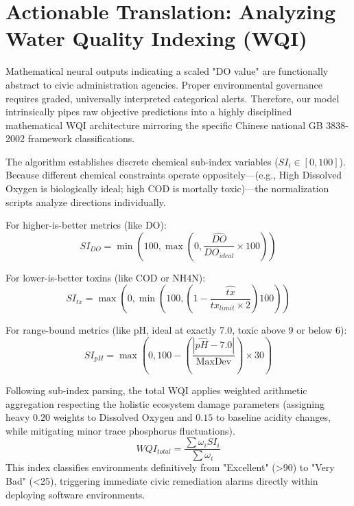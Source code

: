 \documentclass[journal,10pt,twocolumn]{IEEEtran}
\begin{document}
\section{Actionable Translation: Analyzing Water Quality Indexing (WQI)}
Mathematical neural outputs indicating a scaled "DO value" are functionally abstract to civic administration agencies. Proper environmental governance requires graded, universally interpreted categorical alerts. Therefore, our model intrinsically pipes raw objective predictions into a highly disciplined mathematical WQI architecture mirroring the specific Chinese national GB 3838-2002 framework classifications.

The algorithm establishes discrete chemical sub-index variables ($SI_i \in [0, 100]$). Because different chemical constraints operate oppositely—(e.g., High Dissolved Oxygen is biologically ideal; high COD is mortally toxic)—the normalization scripts analyze directions individually.

For higher-is-better metrics (like DO):
\begin{equation}
SI_{DO} = \min\left(100, \max\left(0, \frac{\hat{DO}}{DO_{ideal}} \times 100\right)\right)
\end{equation}

For lower-is-better toxins (like COD or NH4N):
\begin{equation}
SI_{tx} = \max\left(0, \min\left(100, \left(1 - \frac{\hat{tx}}{tx_{limit} \times 2}\right) 100\right)\right)
\end{equation}

For range-bound metrics (like pH, ideal at exactly 7.0, toxic above 9 or below 6):
\begin{equation}
SI_{pH} = \max\left(0, 100 - \left( \frac{|\hat{pH} - 7.0|}{\text{MaxDev}} \right) \times 30\right)
\end{equation}

Following sub-index parsing, the total WQI applies weighted arithmetic aggregation respecting the holistic ecosystem damage parameters (assigning heavy $0.20$ weights to Dissolved Oxygen and $0.15$ to baseline acidity changes, while mitigating minor trace phosphorus fluctuations). 
\begin{equation}
    WQI_{total} = \frac{\sum \omega_i SI_i}{\sum \omega_i}
\end{equation}
This index classifies environments definitively from "Excellent" (>90) to "Very Bad" (<25), triggering immediate civic remediation alarms directly within deploying software environments.
\end{document}
